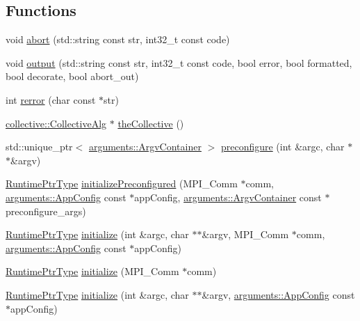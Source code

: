 \subsection*{Functions}
\begin{DoxyCompactItemize}
\item 
void \hyperlink{namespacevt_ad36ca8eb7e5b9cc794a793b290b9c2c7}{abort} (std\+::string const str, int32\+\_\+t const code)
\item 
void \hyperlink{namespacevt_ad3ca3e8710dd3c8badff897f8de3c858}{output} (std\+::string const str, int32\+\_\+t const code, bool error, bool formatted, bool decorate, bool abort\+\_\+out)
\item 
int \hyperlink{namespacevt_aff96ace008dc847d4c0f44cfa5dfb3a0}{rerror} (char const $\ast$str)
\item 
\hyperlink{structvt_1_1collective_1_1_collective_alg}{collective\+::\+Collective\+Alg} $\ast$ \hyperlink{namespacevt_aa8e0c0ab253e7ad1acd5d09e36fea769}{the\+Collective} ()
\item 
std\+::unique\+\_\+ptr$<$ \hyperlink{structvt_1_1arguments_1_1_argv_container}{arguments\+::\+Argv\+Container} $>$ \hyperlink{namespacevt_a92861d98501258a2800b90420bb116ff}{preconfigure} (int \&argc, char $\ast$$\ast$\&argv)
\item 
\hyperlink{namespacevt_a0ce60e0299d8fa32223b3b9ffa0af466}{Runtime\+Ptr\+Type} \hyperlink{namespacevt_a30208aeb42d41dc7534b32bf07ee7985}{initialize\+Preconfigured} (M\+P\+I\+\_\+\+Comm $\ast$comm, \hyperlink{structvt_1_1arguments_1_1_app_config}{arguments\+::\+App\+Config} const $\ast$app\+Config, \hyperlink{structvt_1_1arguments_1_1_argv_container}{arguments\+::\+Argv\+Container} const $\ast$preconfigure\+\_\+args)
\item 
\hyperlink{namespacevt_a0ce60e0299d8fa32223b3b9ffa0af466}{Runtime\+Ptr\+Type} \hyperlink{namespacevt_a580ef23e9a224fc0907da1a6db308b5b}{initialize} (int \&argc, char $\ast$$\ast$\&argv, M\+P\+I\+\_\+\+Comm $\ast$comm, \hyperlink{structvt_1_1arguments_1_1_app_config}{arguments\+::\+App\+Config} const $\ast$app\+Config)
\item 
\hyperlink{namespacevt_a0ce60e0299d8fa32223b3b9ffa0af466}{Runtime\+Ptr\+Type} \hyperlink{namespacevt_a9e13ed8a04b3395bbff2f035cae656af}{initialize} (M\+P\+I\+\_\+\+Comm $\ast$comm)
\item 
\hyperlink{namespacevt_a0ce60e0299d8fa32223b3b9ffa0af466}{Runtime\+Ptr\+Type} \hyperlink{namespacevt_abc3ee2a9bd23da2ae2ffc703d1779b0b}{initialize} (int \&argc, char $\ast$$\ast$\&argv, \hyperlink{structvt_1_1arguments_1_1_app_config}{arguments\+::\+App\+Config} const $\ast$app\+Config)
$$
\end{DoxyCompactItemize}
